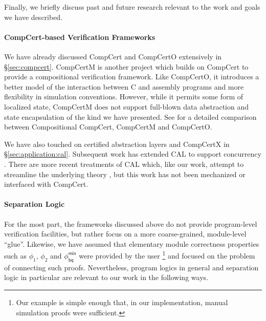 \documentclass[acmsmall,screen,review,anonymous,nonacm]{acmart}
\newcommand{\kw}[1]{\ensuremath{ \mathsf{#1} }}
\begin{document}
Finally, we briefly discuss past and future research
relevant to the work and goals we have described.

\paragraph{CompCert-based Verification Frameworks} %

We have already discussed CompCert and CompCertO
extensively in \S\ref{sec:compcert}.
CompCertM \cite{compcertm} is another project
which builds on CompCert
to provide a compositional verification framework.
Like CompCertO,
it introduces a better model of the interaction between
C and assembly programs
and more flexibility in simulation conventions.
However, while it permits some form of localized state,
CompCertM does not support
full-blown data abstraction and state encapsulation
of the kind we have presented.
See \citet{compcerto}
for a detailed comparison between Compositional CompCert,
CompCertM and CompCertO.

We have also touched on
certified abstraction layers and CompCertX in \S\ref{sec:application:cal}.
Subsequent work has extended CAL to support concurrency \cite{ccal}.
There are more recent treatments of CAL which,
like our work,
attempt to streamline the underlying theory
\citep{popl22,rbgs-cal},
but this work has not been mechanized
or interfaced with CompCert.



\paragraph{Separation Logic} %

For the most part,
the frameworks discussed above
do not provide program-level verification facilities,
but rather focus on a more coarse-grained, module-level ``glue''.
Likewise,
we have assumed that elementary module correctness properties
such as $\phi_1$, $\phi_2$ and $\phi_\kw{bq}^\kw{min}$
were provided by the user%
\footnote{Our example is simple enough that,
  in our implementation,
  manual simulation proofs were
  sufficient.}
and focused on the problem of
connecting such proofs.
Nevertheless,
program logics in general and separation logic in particular
are relevant to our work in the following ways.
\end{document}
